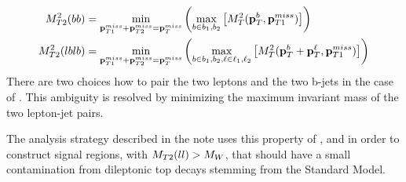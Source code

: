   \begin{align}
    \label{eq:mt2bb}
    M_{T2}^2(bb)   &= \min_{\mathbf{p}_{T1}^{miss} + \mathbf{p}_{T2}^{miss} = \mathbf{p}_T^{miss}} \left( \max_{b \in b_1,b_2} \left[ M_{T}^2(\mathbf{p}_T^{b},\mathbf{p}_{T1}^{miss}) \right] \right) \\
    M_{T2}^2(lblb) &= \min_{\mathbf{p}_{T1}^{miss} + \mathbf{p}_{T2}^{miss} = \mathbf{p}_T^{miss}} \left( \max_{b \in b_1,b_2, \ell \in \ell_1, \ell_2} \left[ M_{T}^2(\mathbf{p}_T^{b} + \mathbf{p}_T^{\ell}, \mathbf{p}_{T1}^{miss}) \right] \right)
  \end{align}
  There are two choices how to pair the two leptons  and the two b-jets in the case of \mtlblb. This ambiguity is resolved by minimizing the maximum invariant mass of the two lepton-jet pairs.

  The analysis strategy described in the note uses this property of \mtll, \mtbb and \mtlblb in order to construct
  signal regions, with $M_{T2}(ll) > M_W$, that should have a small
  contamination from dileptonic top decays stemming from the Standard Model.
